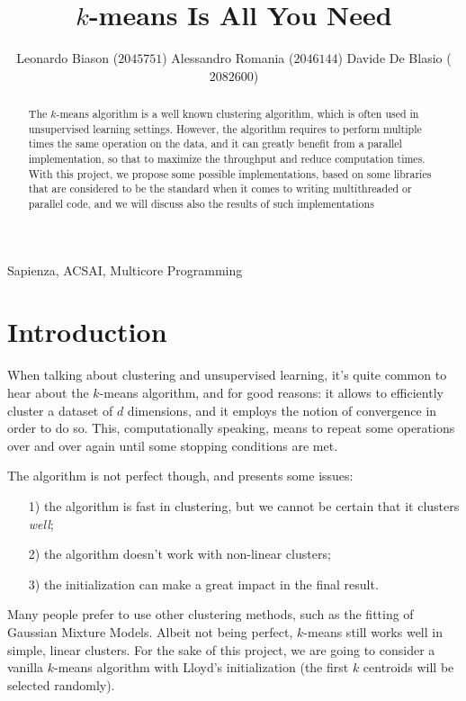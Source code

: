 \documentclass[11pt, journal]{IEEEtran}
\title{$k$-means Is All You Need}
\author{Leonardo Biason ($2045751$) \quad Alessandro Romania ($2046144$) \quad Davide De Blasio ($2082600$)}
\newcommand{\nwl}{

\vspace{11pt}

}
\begin{document}
\maketitle

\begin{abstract}
    The $k$-means algorithm is a well known clustering algorithm, which is often used in unsupervised learning settings. However, the algorithm requires to perform multiple times the same operation on the data, and it can greatly benefit from a parallel implementation, so that to maximize the throughput and reduce computation times. With this project, we propose some possible implementations, based on some libraries that are considered to be the  standard when it comes to writing multithreaded or parallel code, and we will discuss also the results of such implementations
\end{abstract}

\begin{keywords}
    Sapienza, ACSAI, Multicore Programming
\end{keywords}
\nwl

\section{Introduction}

When talking about clustering and unsupervised learning, it's quite common to hear about the $k$-means algorithm, and for good reasons: it allows to efficiently cluster a dataset of $d$ dimensions, and it employs the notion of convergence in order to do so. This, computationally speaking, means to repeat some operations over and over again until some stopping conditions are met.
\nwl
The algorithm is not perfect though, and presents some issues:
\begin{itemize}
    \item [1)] the algorithm is fast in clustering, but we cannot be certain that it clusters \textit{well};
    \item [2)] the algorithm doesn't work with non-linear clusters;
    \item [3)] the initialization can make a great impact in the final result.
\end{itemize}
\nwl
Many people prefer to use other clustering methods, such as the fitting of Gaussian Mixture Models. Albeit not being perfect, $k$-means still works well in simple, linear clusters. For the sake of this project, we are going to consider a vanilla $k$-means algorithm with Lloyd's initialization (the first $k$ centroids will be selected randomly).
\end{document}
